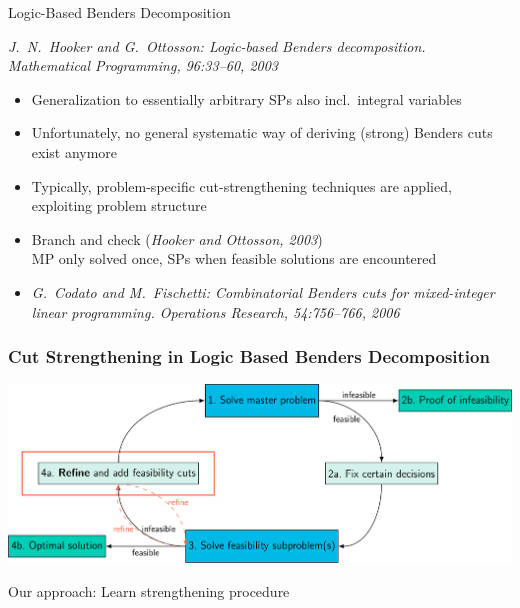 \documentclass[aspectratio=1610]{beamer}
\newcommand{\important}[1]{{\color{green!60!black}#1}}
\begin{document}
\begin{frame}{Logic-Based Benders Decomposition}

\emph{J.\ N.\ Hooker and G.\ Ottosson: Logic-based Benders decomposition. Mathematical Programming, 96:33--60, 2003}

\bigskip
\begin{itemize}
	\itemsep1.5ex
	\item Generalization to essentially \important{arbitrary SPs also incl.\ integral variables}
	\item Unfortunately, \alert{no general systematic way of deriving (strong) Benders cuts} exist anymore
	\item Typically, \important{problem-specific cut-strengthening techniques} are applied,\\ exploiting problem structure
\end{itemize}

\bigskip
{}
\begin{itemize}
	\item Branch and check (\emph{Hooker and Ottosson, 2003})\\
	MP only solved once, SPs when feasible solutions are encountered
	\item \emph{G.~Codato and M.~Fischetti: Combinatorial Benders cuts for mixed-integer linear programming. Operations Research, 54:756--766, 2006} \nocite{2006_codato-fischetti_article}
\end{itemize}

\end{frame}
	



\begin{frame}
	\frametitle{Cut Strengthening in Logic Based Benders Decomposition}
	\begin{centering}
		\includegraphics[width=\textwidth]{graphics/lbbd2}
	\end{centering}

	\bigskip
	Our approach: \important{Learn strengthening procedure}
\end{frame}
\end{document}
